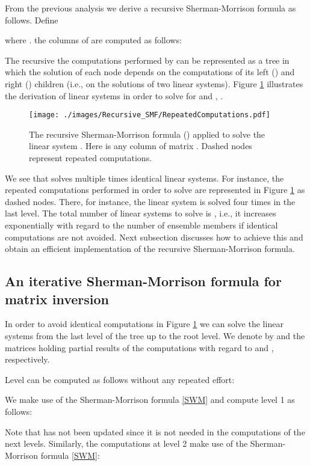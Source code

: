 \documentclass[12pt]{article}
\begin{document}
From the previous analysis we derive a recursive Sherman-Morrison formula as follows. Define

where . the columns of  are computed as follows:


The recursive the computations performed by  can be represented as a tree in which the solution 
 of each node depends on the computations of its left () and right () children (i.e., on the solutions of two linear systems). Figure \ref{Fig:sherman-full} illustrates the derivation of linear systems in order to solve  for  and , .


\begin{figure}[H]
  \centering
	      \texttt{[image: ./images/Recursive\_SMF/RepeatedComputations.pdf]}
  \caption{\label{Fig:sherman-full}The recursive Sherman-Morrison formula () applied to solve the linear system .   Here  is any column of matrix . Dashed nodes represent repeated computations.}
\end{figure}


We see that  solves multiple times identical linear systems. For instance, the repeated computations performed in order to solve  are represented in Figure \ref{Fig:sherman-full} as dashed nodes. There, for instance, the linear system  is solved four times in the last level. The total number of linear systems to solve is , i.e., it increases exponentially with regard to the number of ensemble members if identical computations are not avoided. Next subsection discusses how to achieve this and obtain an efficient implementation of the recursive Sherman-Morrison formula.


\subsection{An iterative Sherman-Morrison formula for matrix inversion}
\label{Sec:IterativeShermanMorrison}


In order to avoid identical computations  in Figure \ref{Fig:sherman-full} we can solve the linear systems from the last level of the tree up to the root level. We denote by  and  the matrices holding partial results of the computations with regard to  and , respectively. 

Level  can be computed as follows without any repeated effort: 

We make use of the Sherman-Morrison formula \eqref{SWM} and compute level 1 as follows:

Note that  has not been updated since it is not needed in the computations of the next levels. Similarly, the computations at level 2 make use of the Sherman-Morrison formula \eqref{SWM}:
\end{document}
